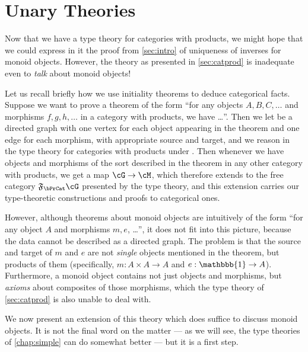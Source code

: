 \documentclass{book}
\newcommand{\F}[1]{\mathfrak{F}_{#1}}
\def\unit{\mathbbb{1}}%
\begin{document}

\section{Unary Theories}
\label{sec:unary-theories}

Now that we have a type theory for categories with products, we might hope that we could express in it the proof from \cref{sec:intro} of uniqueness of inverses for monoid objects.
However, the theory as presented in \cref{sec:catprod} is inadequate even to \emph{talk} about monoid objects!

Let us recall briefly how we use initiality theorems to deduce categorical facts.
Suppose we want to prove a theorem of the form ``for any objects $A,B,C,\dots$ and morphisms $f,g,h,\dots$ in a category with products, we have \dots''.
Then we let \cG be a directed graph with one vertex for each object appearing in the theorem and one edge for each morphism, with appropriate source and target, and we reason in the type theory for categories with products under \cG.
Then whenever we have objects and morphisms of the sort described in the theorem in any other category \cM with products, we get a map $\cG\to\cM$, which therefore extends to the free category $\F\bPrCat\cG$ presented by the type theory, and this extension carries our type-theoretic constructions and proofs to categorical ones.

However, although theorems about monoid objects are intuitively of the form ``for any object $A$ and morphisms $m,e$, \dots'', it does not fit into this picture, because the data cannot be described as a directed graph.
The problem is that the source and target of $m$ and $e$ are not \emph{single} objects mentioned in the theorem, but products of them (specifically, $m:A\times A\to A$ and $e:\unit\to A$).
Furthermore, a monoid object contains not just objects and morphisms, but \emph{axioms} about composites of those morphisms, which the type theory of \cref{sec:catprod} is also unable to deal with.

We now present an extension of this theory which does suffice to discuss monoid objects.
It is not the final word on the matter --- as we will see, the type theories of \cref{chap:simple} can do somewhat better --- but it is a first step.
\end{document}

